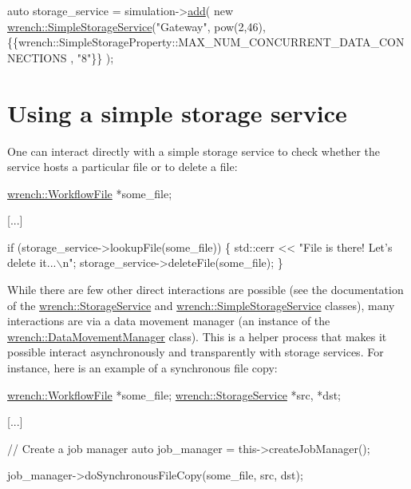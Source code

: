 \begin{DoxyCode}
\textcolor{keyword}{auto} storage\_service = simulation->\hyperlink{classwrench_1_1_simulation_ad1f5c12285ecfaf5a2ce7dab5ec8b4c5}{add}(
          \textcolor{keyword}{new} \hyperlink{classwrench_1_1_simple_storage_service}{wrench::SimpleStorageService}(\textcolor{stringliteral}{"Gateway"}, 
                                  pow(2,46),
                                       \{\{wrench::SimpleStorageProperty::MAX\_NUM\_CONCURRENT\_DATA\_CONNECTIONS
      , \textcolor{stringliteral}{"8"}\}\}
                                      );
\end{DoxyCode}
\hypertarget{guide-simplestorage_guide-simplestorage-using}{}\section{Using a simple storage service}\label{guide-simplestorage_guide-simplestorage-using}
One can interact directly with a simple storage service to check whether the service hosts a particular file or to delete a file\+:


\begin{DoxyCode}
\hyperlink{classwrench_1_1_workflow_file}{wrench::WorkflowFile} *some\_file;

[...]

\textcolor{keywordflow}{if} (storage\_service->lookupFile(some\_file)) \{
  std::cerr << \textcolor{stringliteral}{"File is there! Let's delete it...\(\backslash\)n"};
  storage\_service->deleteFile(some\_file);
\}
\end{DoxyCode}


While there are few other direct interactions are possible (see the documentation of the {\ttfamily \hyperlink{classwrench_1_1_storage_service}{wrench\+::\+Storage\+Service}} and {\ttfamily \hyperlink{classwrench_1_1_simple_storage_service}{wrench\+::\+Simple\+Storage\+Service}} classes), many interactions are via a data movement manager (an instance of the {\ttfamily \hyperlink{classwrench_1_1_data_movement_manager}{wrench\+::\+Data\+Movement\+Manager}} class). This is a helper process that makes it possible interact asynchronously and transparently with storage services. For instance, here is an example of a synchronous file copy\+:


\begin{DoxyCode}
\hyperlink{classwrench_1_1_workflow_file}{wrench::WorkflowFile} *some\_file;
\hyperlink{classwrench_1_1_storage_service}{wrench::StorageService} *src, *dst;

[...]

\textcolor{comment}{// Create a job manager}
\textcolor{keyword}{auto} job\_manager = this->createJobManager();

job\_manager->doSynchronousFileCopy(some\_file, src, dst);
\end{DoxyCode}


